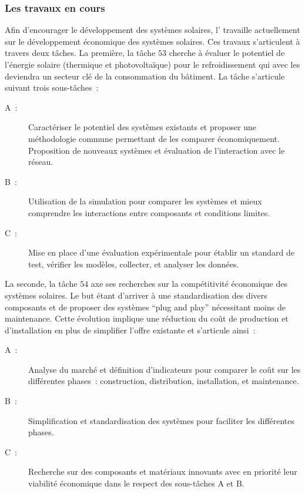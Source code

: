 \subsubsection{Les travaux en cours} %
\label{ssub:les_travaux_en_cours}
Afin d’encourager le développement des systèmes solaires, l’ travaille
actuellement sur le développement économique des systèmes solaires. Ces travaux s’articulent
à travers deux tâches. La première, la tâche $53$ cherche à évaluer le potentiel
de l’énergie solaire (thermique et photovoltaïque) pour le refroidissement qui
avec les  deviendra un secteur clé de la consommation du bâtiment.
La tâche s’articule suivant trois sous-tâches~:
\begin{description}
    \item[A~:] Caractériser le potentiel des systèmes existants et proposer une méthodologie
                commune permettant de les comparer économiquement. Proposition de nouveaux
                systèmes et évaluation de l’interaction avec le réseau.
    \item[B~:] Utilisation de la simulation pour comparer les systèmes et mieux
                comprendre les interactions entre composants et conditions limites.
    \item[C~:] Mise en place d’une évaluation expérimentale pour établir un standard
                de test, vérifier les modèles, collecter, et analyser les données.
\end{description}
La seconde, la tâche $54$ axe ses recherches sur la compétitivité économique des
systèmes solaires. Le but étant d’arriver à une standardisation des
divers composants et de proposer des systèmes \enquote{plug and play} nécessitant
moins de maintenance. Cette évolution implique une réduction du coût de production
et d’installation en plus de simplifier l’offre existante et s’articule ainsi~:
\begin{description}
    \item [A~:] Analyse du marché et définition d’indicateurs pour comparer le coût
                sur les différentes phases~: construction, distribution, installation, et maintenance.
    \item [B~:] Simplification et standardisation des systèmes pour faciliter les différentes
                phases.
    \item [C~:] Recherche sur des composants et matériaux innovants avec en priorité
                leur viabilité économique dans le respect des sous-tâches A et B.
\end{description}
